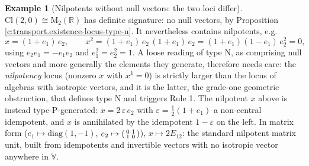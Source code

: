 \documentclass[11pt]{article}
\theoremstyle{definition}
\newtheorem{example}[theorem]{Example}
\theoremstyle{plain}
\providecommand{\Cl}{}\renewcommand{\Cl}{\mathrm{Cl}}
\providecommand{\Mat}{}\renewcommand{\Mat}{\mathrm{M}}
\providecommand{\R}{}\renewcommand{\R}{\mathbb{R}}
\begin{document}
\begin{example}[Nilpotents without null vectors: the two loci differ]\label{c:note.transport.nilpotents-without-null-vectors-two-loci}
$\Cl(2,0) \cong \Mat_2(\R)$ has definite signature: no null vectors, by Proposition \ref{c:transport.existence-locus-type-n}. It nevertheless contains nilpotents, e.g.
\[
x = (1 + e_1)\,e_2, \qquad x^2 = (1+e_1)\,e_2\,(1+e_1)\,e_2 = (1+e_1)(1-e_1)\,e_2^2 = 0,
\]
using $e_2 e_1 = -e_1 e_2$ and $e_1^2 = e_2^2 = 1$. A loose reading of type N, as comprising null vectors and more generally the elements they generate, therefore needs care: the \emph{nilpotency} locus (nonzero $x$ with $x^k = 0$) is strictly larger than the locus of algebras with isotropic vectors, and it is the latter, the grade-one geometric obstruction, that defines type N and triggers Rule 1. The nilpotent $x$ above is instead type-P-generated: $x = 2\,\varepsilon\, e_2$ with $\varepsilon = \tfrac12(1 + e_1)$ a non-central idempotent, and $x$ is annihilated by the idempotent $1 - \varepsilon$ on the left. In matrix form ($e_1 \mapsto \mathrm{diag}(1,-1)$, $e_2 \mapsto \begin{psmallmatrix} 0 & 1 \\ 1 & 0\end{psmallmatrix}$), $x \mapsto 2E_{12}$: the standard nilpotent matrix unit, built from idempotents and invertible vectors with no isotropic vector anywhere in $\mathbb{V}$.
\end{example}
\end{document}
